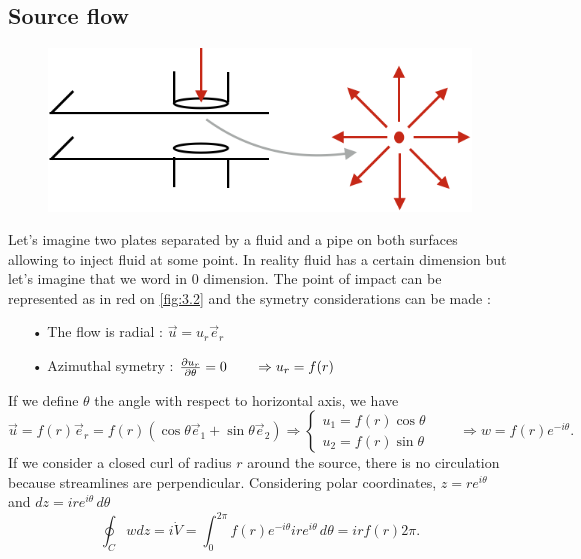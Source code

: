 	\subsection{Source flow}
		\begin{figure}
		\vspace{-5mm}
		\includegraphics[scale=0.5]{ch3/2}
		\label{fig:3.2}
		\end{figure}		
		Let's imagine two plates separated by a fluid and a pipe on both surfaces allowing to inject fluid at some point. In reality fluid has a certain dimension but let's imagine that we word in 0 dimension. The point of impact can be represented as in red on \autoref{fig:3.2} and the symetry considerations can be made : 
		\ \\
		\begin{itemize}
			\item[•] The flow is radial : $\vec{u} = u_r \vec{e}_r$
			\item[•] Azimuthal symetry : $\frac{\partial u_r}{\partial \theta} = 0\qquad \Rightarrow u_r = f(r)$\\
		\end{itemize}
		If we define $\theta$ the angle with respect to horizontal axis, we have 
		\begin{equation}
			\vec{u} = f(r) \vec{e}_r = f(r) (\cos \theta \vec{e}_1 + \sin \theta \vec{e}_2)  \Rightarrow \left\{
			\begin{aligned}
			u_1 = f(r) \cos \theta \\
			u_2 = f(r) \sin \theta
			\end{aligned}
			\right.
			\qquad
			\Rightarrow 
			w = f(r)e^{-i\theta}.
		\end{equation}
		If we consider a closed curl of radius $r$ around the source, there is no circulation because streamlines are perpendicular. Considering polar coordinates, $z = re^{i\theta}$ and $dz = ire^{i\theta}\, d\theta$ 
		\begin{equation}
			\oint _C wdz = i\dot{V} = \int _0^{2\pi} f(r) e^{-i\theta}   ire^{i\theta}\, d\theta = ir f(r) 2\pi.
		\end{equation}

